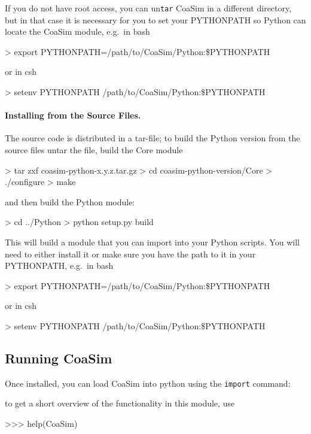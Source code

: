 \documentclass{manual}
\begin{document}
If you do not have root access, you can un\texttt{tar} CoaSim in a
different directory, but in that case it is necessary for you to set
your PYTHONPATH so Python can locate the CoaSim module, e.g.\ in bash
\begin{code}
> export PYTHONPATH=/path/to/CoaSim/Python:\$PYTHONPATH
\end{code}
or in csh
\begin{code}
> setenv PYTHONPATH /path/to/CoaSim/Python:\$PYTHONPATH
\end{code}


\paragraph{Installing from the Source Files.}

The source code is distributed in a tar-file; to build the Python version from
the source files untar the file, build the Core module
\begin{code}
> tar zxf coasim-python-x.y.z.tar.gz
> cd coasim-python-version/Core
> ./configure
> make
\end{code}
and then build the Python module:
\begin{code}
> cd ../Python
> python setup.py build
\end{code}

This will build a module that you can import into your Python scripts.
You will need to either install it or make sure you have the path to
it in your PYTHONPATH, e.g.\ in bash
\begin{code}
> export PYTHONPATH=/path/to/CoaSim/Python:\$PYTHONPATH
\end{code}
or in csh
\begin{code}
> setenv PYTHONPATH /path/to/CoaSim/Python:\$PYTHONPATH
\end{code}

\subsection{Running CoaSim}

Once installed, you can load CoaSim into python using the
\texttt{import} command:
to get a short overview of the functionality in this module, use
\begin{code}
>>> help(CoaSim)
\end{code}
\end{document}
